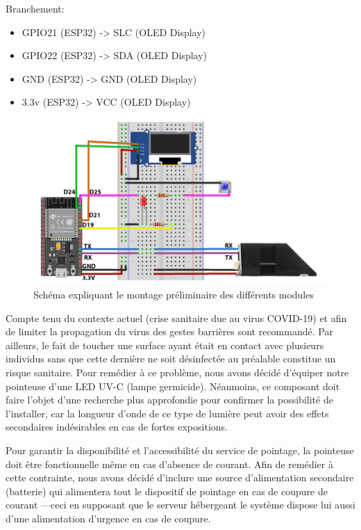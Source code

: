 Branchement: 
\begin{itemize}
    \item [\textbullet]GPIO21 (ESP32) -> SLC (OLED Display)
    \item [\textbullet]GPIO22 (ESP32) -> SDA (OLED Display)
    \item [\textbullet]GND (ESP32) -> GND (OLED Display) 
    \item [\textbullet]3.3v (ESP32) -> VCC (OLED Display)
\end{itemize}    

\begin{figure}[h!]
    \centering
    \includegraphics[scale=0.2]{images/schema/schemat_globale.png}
    \caption{Schéma expliquant le montage préliminaire des différents modules}
    \label{fig54}
\end{figure}

Compte tenu du contexte actuel (crise sanitaire due au virus COVID-19) et afin 
de limiter la propagation du virus des gestes barrières sont recommandé. Par 
ailleurs, le fait de toucher une surface ayant était en contact avec plusieurs 
individus sans que cette dernière ne soit désinfectée au préalable constitue un 
risque sanitaire. Pour remédier à ce problème, nous avons décidé d’équiper 
notre pointeuse d’une LED UV-C (lampe germicide). Néanmoins, ce composant doit 
faire l’objet d’une recherche plus approfondie pour confirmer la possibilité 
de l’installer, car la longueur d’onde de ce type de lumière peut avoir des 
effets secondaires indésirables en cas de fortes expositions.

Pour garantir la disponibilité et l’accessibilité du service de pointage, la 
pointeuse doit être fonctionnelle même en cas d’absence de courant. Afin de 
remédier à cette contrainte, nous avons décidé d’inclure une source 
d’alimentation secondaire (batterie) qui alimentera tout le dispositif de 
pointage en cas de coupure de courant ---ceci en supposant que le serveur
hébergeant le système dispose lui aussi d’une alimentation d’urgence en cas de
coupure.    

